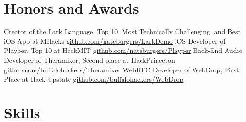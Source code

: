 \documentclass[11pt,a4paper,sans]{moderncv}   %
\begin{document}
\section{Honors and Awards}
 {Creator of the Lark Language, Top 10, Most Technically Challenging, and Best iOS App at MHacks \newline \url{github.com/nateburgers/LarkDemo}}
 {iOS Developer of Playper, Top 10 at HackMIT \newline \url{github.com/nateburgers/Playper}}
 {Back-End Audio Developer of Theramixer, Second place at HackPrinceton \newline \url{github.com/buffalohackers/Theramixer}}
 {WebRTC Developer of WebDrop, First Place at Hack Upstate \newline \url{github.com/buffalohackers/WebDrop}}

\section{Skills}
\end{document}
